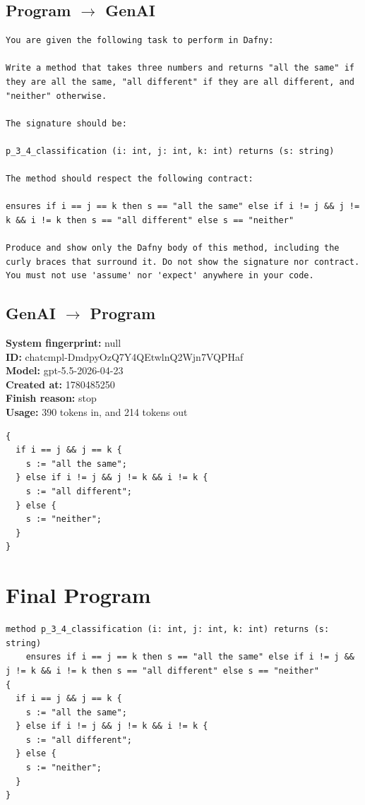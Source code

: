 \documentclass{article}
\begin{document}
\subsection*{Program $\rightarrow$ GenAI}
\begin{lstlisting}
You are given the following task to perform in Dafny:

Write a method that takes three numbers and returns "all the same" if they are all the same, "all different" if they are all different, and "neither" otherwise.

The signature should be:

p_3_4_classification (i: int, j: int, k: int) returns (s: string)

The method should respect the following contract:

ensures if i == j == k then s == "all the same" else if i != j && j != k && i != k then s == "all different" else s == "neither"

Produce and show only the Dafny body of this method, including the curly braces that surround it. Do not show the signature nor contract. You must not use 'assume' nor 'expect' anywhere in your code.
\end{lstlisting}
\subsection*{GenAI $\rightarrow$ Program}
\textbf{System fingerprint: }null
\\\textbf{ID: }chatcmpl-DmdpyOzQ7Y4QEtwlnQ2Wjn7VQPHaf
\\\textbf{Model: }gpt-5.5-2026-04-23
\\\textbf{Created at: }1780485250
\\\textbf{Finish reason: }stop
\\\textbf{Usage: }390 tokens in, and 214 tokens out
\begin{lstlisting}
{
  if i == j && j == k {
    s := "all the same";
  } else if i != j && j != k && i != k {
    s := "all different";
  } else {
    s := "neither";
  }
}
\end{lstlisting}
\section*{Final Program}
\begin{lstlisting}
method p_3_4_classification (i: int, j: int, k: int) returns (s: string)
	ensures if i == j == k then s == "all the same" else if i != j && j != k && i != k then s == "all different" else s == "neither"
{
  if i == j && j == k {
    s := "all the same";
  } else if i != j && j != k && i != k {
    s := "all different";
  } else {
    s := "neither";
  }
}
\end{lstlisting}
\end{document}
